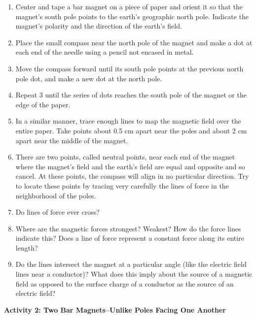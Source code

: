 \begin{enumerate}
\item Center and tape a bar magnet on a piece of paper and orient it so
that the magnet's south pole points to the earth's geographic north
pole. Indicate the magnet's polarity and the direction of the earth's
field.
\item Place the small compass near the north pole of the magnet and make
a dot at each end of the needle using a pencil not encased in metal.
\item Move the compass forward until its south pole points at the previous
north pole dot, and make a new dot at the north pole.
\item Repeat 3 until the series of dots reaches the south pole of the magnet
or the edge of the paper.
\item In a similar manner, trace enough lines to map the magnetic field
over the entire paper. Take points about 0.5 cm apart near the poles
and about 2 cm apart near the middle of the magnet.
\item There are two points, called neutral points, near each end of the
magnet where the magnet's field and the earth's field are equal and
opposite and so cancel. At these points, the compass will align in
no particular direction. Try to locate these points by tracing very
carefully the lines of force in the neighborhood of the poles.
\item Do lines of force ever cross?\vspace{15mm}

\item Where are the magnetic forces strongest? Weakest? How do the force
lines indicate this? Does a line of force represent a constant force
along its entire length?\vspace{15mm}

\item Do the lines intersect the magnet at a particular angle (like the
electric field lines near a conductor)? What does this imply about
the source of a magnetic field as opposed to the surface charge of
a conductor as the source of an electric field? \vspace{15mm}

\end{enumerate}
\textbf{Activity 2: Two Bar Magnets--Unlike Poles Facing One Another}

\vspace{0.3cm}
{\centering {} \par}
\vspace{0.3cm}

